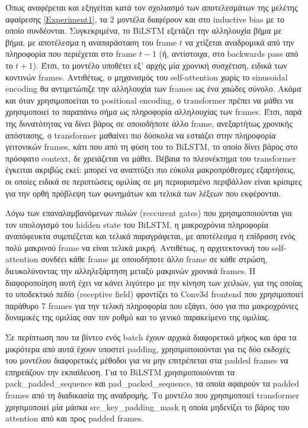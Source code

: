 Όπως αναφέρεται και εξηγείται κατά τον σχολιασμό των αποτελεσμάτων της μελέτης αφαίρεσης \ref{Experiment1}, τα 2 μοντέλα διαφέρουν και στο inductive bias με το οποίο συνδέονται. Συγκεκριμένα, το BiLSTM εξετάζει την αλληλουχία βήμα με βήμα, με αποτέλεσμα η αναπαράσταση του frame $t$ να χτίζεται αναδρομικά από την πληροφορία που περιέχεται στο frame $t-1$ (ή, αντίστοιχα, στο backwards pass από το $t+1$). Έτσι, το μοντέλο υποθέτει εξ' αρχής μία χρονική συσχέτιση, ειδικά των κοντινών frames. Αντιθέτως, ο μηχανισμός του self-attention χωρίς το sinusoidal encoding θα αντιμετώπιζε την αλληλουχία των frames ως ένα χαώδες σύνολο. Ακόμα και όταν χρησιμοποείται το positional encoding, ο transformer πρέπει να μάθει να χρησιμοποιεί το παραπάνω σήμα ως πληροφορία αλληλουχίας των frames. Έτσι, παρά της δυνατότητας να δίνει βάρος σε οποιοδήποτε άλλο frame, ανεξαρτήτως χρονικής απόστασης, ο transformer μαθαίνει πιο δύσκολα να εστιάζει στην πληροφορία γειτονικών frames, κάτι που από τη φύση του το BiLSTM, το οποίο δίνει βάρος στο πρόσφατο context, δε χρειάζεται να μάθει. Βέβαια το πλεονέκτημα του transformer έγκειται ακριβώς εκεί: μπορεί να αναπτύξει πιο εύκολα μακροπρόθεσμες εξαρτήσεις, οι οποίες ειδικά σε περιπτώσεις ομιλίας σε μη περιορισμένο περιβάλλον είναι κρίσιμες για την ορθή πρόβλεψη των φωνημάτων και τελικά των λέξεων που εκφέρονται.

Λόγω των επαναλαμβανόμενων πυλών (reccurent gates) που χρησιμοποιούνται για τον υπολογισμό του hidden state του BiLSTM, η μακροχρόνια πληροφορία αναπόφευκτα συμπιέζεται και τελικά παραγράφεται, με αποτέλεσμα η επίδραση ενός πολύ μακρινού frame να είναι τελικά μικρή. Αντιθέτως, η αρχιτεκτονική του self-attention συνδέει κάθε frame με οποιοδήποτε άλλο frame σε κάθε στρώση, διευκολύνοντας την αλληλεξάρτηση μεταξύ μακρινών χρονικά frames. Η διαφοροποίηση αυτή έχει να κάνει λιγότερο με την κίνηση των χειλιών, για της οποίας το υποδεκτικό πεδίο (receptive field) φροντίζει το Conv3d frontend που χρησιμοποιεί παράθυρο 7 frames για την τελική πληροφορία που εξάγει, όσο για πιο μακροχρόνιες δυναμικές της ομιλίας σαν τον ρυθμό και το γενικό παρακείμενο της ομιλίας.

Σε περίπτωση που τα βίντεο ενός batch έχουν αρχικά διαφορετικό μήκος και άρα τα μικρότερα από αυτά έχουν υποστεί padding, χρησιμοποιούνται για τις δύο εκδοχές του μοντέλου διαφορετικές μέθοδοι για να μην επιτρέπεται στα padded frames να επηρεάζουν την εκπαίδευση. Για το BiLSTM χρησιμοποιούνται τα pack\_padded\_sequence και pad\_packed\_sequence, τα οποία αφαιρούν τα padded frames από τη διαδικασία της αναδρομής. Το μοντέλο που χρησιμοποιεί transformer χρησιμοποιεί μία μάσκα src\_key\_padding\_mask η οποία μηδενίζει το βάρος του attention από και προς padded frames. 


